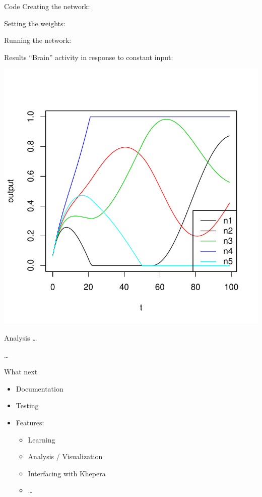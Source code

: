 \documentclass[12pt]{beamer}
\begin{document}
\begin{frame}[fragile]{Code}
  Creating the network:
  
  \pause
  Setting the weights:
  
  \pause
  Running the network:
  
\end{frame}

\begin{frame}{Results}
  ``Brain'' activity in response to constant input:
  \begin{center}
    \includegraphics[width=.7\textwidth]{recnetGood2}
  \end{center}
  \vfill
\end{frame}

\begin{frame}[fragile]{Analysis}
  \ldots
  
  \ldots
\end{frame}

\begin{frame}{What next}
  \begin{itemize}
  \item Documentation
  \item Testing
  \item Features:
    \begin{itemize}
    \item Learning
    \item Analysis / Visualization
    \item Interfacing with Khepera
    \item \ldots
    \end{itemize}

  \end{itemize}
\end{frame}
\end{document}
